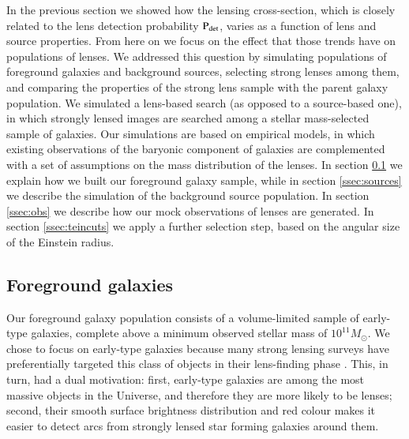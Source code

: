 \documentclass{aa}
\def\pdet{{\rm P}_\mathrm{det}}
\def\Sref#1{Section~\ref{#1}\xspace}
\begin{document}
In the previous section we showed how the lensing cross-section, which is closely related to the lens detection probability $\pdet$, varies as a function of lens and source properties.
From here on we focus on the effect that those trends have on populations of lenses.
We addressed this question by simulating populations of foreground galaxies and background sources, selecting strong lenses among them, and comparing the properties of the strong lens sample with the parent galaxy population.
We simulated a lens-based search (as opposed to a source-based one), in which strongly lensed images are searched among a stellar mass-selected sample of galaxies.
Our simulations are based on empirical models, in which existing observations of the baryonic component of galaxies are complemented with a set of assumptions on the mass distribution of the lenses.
In section \ref{ssec:lenses} we explain how we built our foreground galaxy sample,
while in section \ref{ssec:sources} we describe the simulation of the background source population.
In section \ref{ssec:obs} we describe how our mock observations of lenses are generated.
In section \ref{ssec:teincuts} we apply a further selection step, based on the angular size of the Einstein radius.



\subsection{Foreground galaxies}\label{ssec:lenses}

Our foreground galaxy population consists of a volume-limited sample of early-type galaxies, complete above a minimum observed stellar mass of $10^{11}M_\odot$.
We chose to focus on early-type galaxies because many strong lensing surveys have preferentially targeted this class of objects in their lens-finding phase \citep[e.g.][]{Bol++06,Gav++12,Son++18a}.
This, in turn, had a dual motivation:
first, early-type galaxies are among the most massive objects in the Universe, and therefore they are more likely to be lenses;
second, their smooth surface brightness distribution and red colour makes it easier to detect arcs from strongly lensed star forming galaxies around them.
\end{document}
